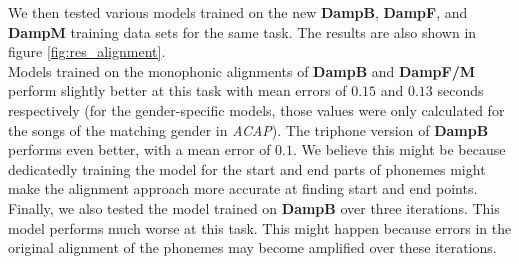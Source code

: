 We then tested various models trained on the new \textbf{DampB}, \textbf{DampF}, and \textbf{DampM} training data sets for the same task. The results are also shown in figure \ref{fig:res_alignment}.\\
Models trained on the monophonic alignments of \textbf{DampB} and \textbf{DampF/M} perform slightly better at this task with mean errors of $0.15$ and $0.13$ seconds respectively (for the gender-specific models, those values were only calculated for the songs of the matching gender in \textit{ACAP}). The triphone version of \textbf{DampB} performs even better, with a mean error of $0.1$. We believe this might be because dedicatedly training the model for the start and end parts of phonemes might make the alignment approach more accurate at finding start and end points.\\
Finally, we also tested the model trained on \textbf{DampB} over three iterations. This model performs much worse at this task. This might happen because errors in the original alignment of the phonemes may become amplified over these iterations.

